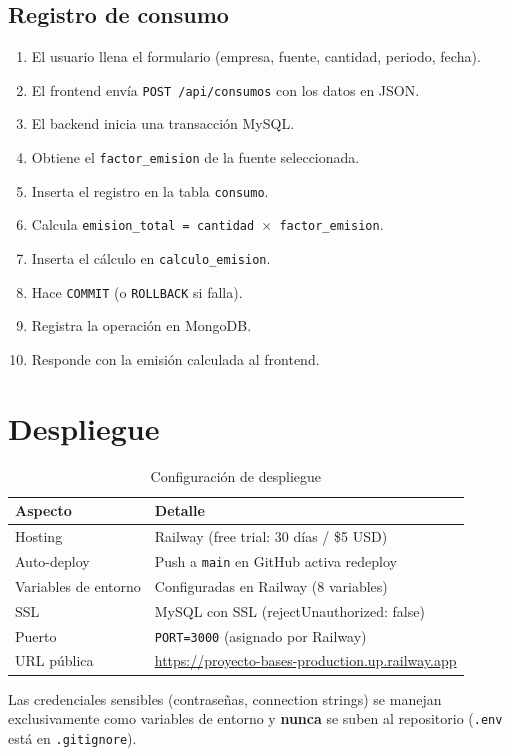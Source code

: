 \documentclass[12pt, a4paper]{article}
\begin{document}
\subsection{Registro de consumo}
\begin{enumerate}[nosep]
  \item El usuario llena el formulario (empresa, fuente, cantidad, periodo, fecha).
  \item El frontend envía \texttt{POST /api/consumos} con los datos en JSON.
  \item El backend inicia una transacción MySQL.
  \item Obtiene el \texttt{factor\_emision} de la fuente seleccionada.
  \item Inserta el registro en la tabla \texttt{consumo}.
  \item Calcula \texttt{emision\_total = cantidad $\times$ factor\_emision}.
  \item Inserta el cálculo en \texttt{calculo\_emision}.
  \item Hace \texttt{COMMIT} (o \texttt{ROLLBACK} si falla).
  \item Registra la operación en MongoDB.
  \item Responde con la emisión calculada al frontend.
\end{enumerate}
\section{Despliegue}
\begin{table}[H]
\centering
\begin{tabular}{@{}ll@{}}
\toprule
\textbf{Aspecto} & \textbf{Detalle} \\
\midrule
Hosting          & Railway (free trial: 30 días / \$5 USD) \\
Auto-deploy      & Push a \texttt{main} en GitHub activa redeploy \\
Variables de entorno & Configuradas en Railway (8 variables) \\
SSL              & MySQL con SSL (rejectUnauthorized: false) \\
Puerto           & \texttt{PORT=3000} (asignado por Railway) \\
URL pública      & \url{https://proyecto-bases-production.up.railway.app} \\
\bottomrule
\end{tabular}
\caption{Configuración de despliegue}
\end{table}
Las credenciales sensibles (contraseñas, connection strings) se manejan exclusivamente como variables de entorno y \textbf{nunca} se suben al repositorio (\texttt{.env} está en \texttt{.gitignore}).
\end{document}
